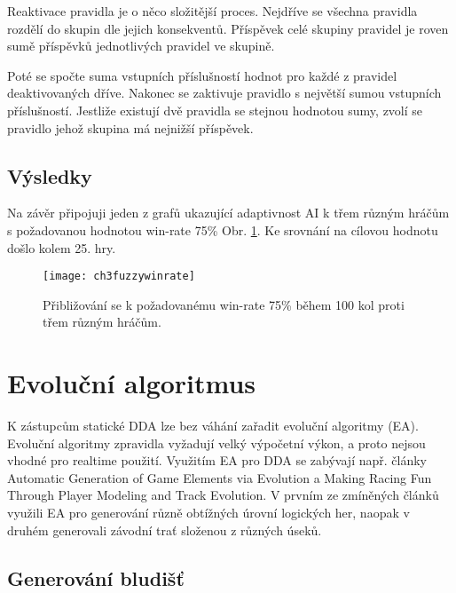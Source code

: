 Reaktivace pravidla je o něco složitější proces. Nejdříve se všechna pravidla rozdělí do skupin dle jejich konsekventů. Příspěvek celé skupiny pravidel je roven sumě příspěvků jednotlivých pravidel ve skupině. 

Poté se spočte suma vstupních příslušností hodnot pro každé z pravidel deaktivovaných dříve. Nakonec se zaktivuje pravidlo s největší sumou vstupních příslušností. Jestliže existují dvě pravidla se stejnou hodnotou sumy, zvolí se pravidlo jehož skupina má nejnižší příspěvek.

\subsection{Výsledky}

Na závěr připojuji jeden z grafů ukazující adaptivnost AI k třem různým hráčům s požadovanou hodnotou win-rate 75\% Obr. \ref{fig-ch3fuzzywinrate}. Ke srovnání na cílovou hodnotu došlo kolem 25. hry. 

\begin{figure}
  \centering
  \texttt{[image: ch3fuzzywinrate]}
	\caption{Přibližování se k požadovanému win-rate 75\% během 100 kol proti třem různým hráčům. \cite{25deadend} }
	\label{fig-ch3fuzzywinrate}
\end{figure}

\section{Evoluční algoritmus} \label{sec:evol}

K zástupcům statické DDA lze bez váhání zařadit evoluční algoritmy (EA). Evoluční algoritmy zpravidla vyžadují velký výpočetní výkon, a proto nejsou vhodné pro realtime použití. Využitím EA pro DDA se zabývají např. články Automatic Generation of Game Elements via Evolution\cite{17Evol} a Making Racing Fun Through Player Modeling
and Track Evolution\cite{EvolTrack}. V prvním ze zmíněných článků využili EA pro generování různě obtížných úrovní logických her, naopak v druhém generovali závodní trať složenou z různých úseků.

\subsection{Generování bludišť}

